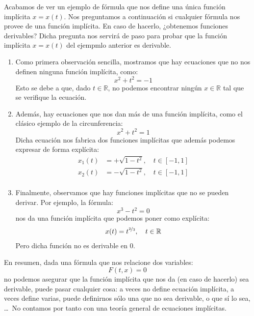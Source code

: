 Acabamos de ver un ejemplo de fórmula que nos define una única función implícita $x=x(t)$.  Nos preguntamos a continuación si cualquier fórmula nos provee de una función implícita. En caso de hacerlo, ¿obtenemos funciones derivables? Dicha pregunta nos servirá de paso para probar que la función implícita $x=x(t)$ del ejempmlo anterior es derivable.
\begin{enumerate}
    \item Como primera observación sencilla, mostramos que hay ecuaciones que no nos definen ninguna función implícita, como:
        \begin{equation*}
            x^2+t^2 = -1
        \end{equation*}
        Esto se debe a que, dado $t\in \mathbb{R}$, no podemos encontrar ningún $x\in \mathbb{R}$ tal que se verifique la ecuación.

    \item Además, hay ecuaciones que nos dan más de una función implícita, como el clásico ejemplo de la circunferencia:
        \begin{equation*}
            x^2 + t^2 = 1
        \end{equation*}
        Dicha ecuación nos fabrica dos funciones implícitas que además podemos expresar de forma explícita:
        \begin{align*}
            x_1(t) &= +\sqrt{1-t^2}, \quad t\in [-1,1] \\
            x_2(t) &= -\sqrt{1-t^2}, \quad t\in [-1,1] \\
        \end{align*}

    \item Finalmente, observamos que hay funciones implícitas que no se pueden derivar. Por ejemplo, la fórmula:
        \begin{equation*}
            x^3-t^2 = 0
        \end{equation*}
        nos da una función implícita que podemos poner como explícita:
        \begin{equation*}
            x(t) = t^{\nicefrac{2}{3}}, \quad t\in \mathbb{R}
        \end{equation*}
        Pero dicha función no es derivable en 0.
\end{enumerate}

En resumen, dada una fórmula que nos relacione dos variables:
\begin{equation*}
    F(t,x) = 0
\end{equation*}
no podemos asegurar que la función implícita que nos da (en caso de hacerlo) sea derivable, puede pasar cualquier cosa: a veces no define ecuación implícita, a veces define varias, puede definirnos sólo una que no sea derivable, o que sí lo sea, \ldots~No contamos por tanto con una teoría general de ecuaciones implícitas.\\

